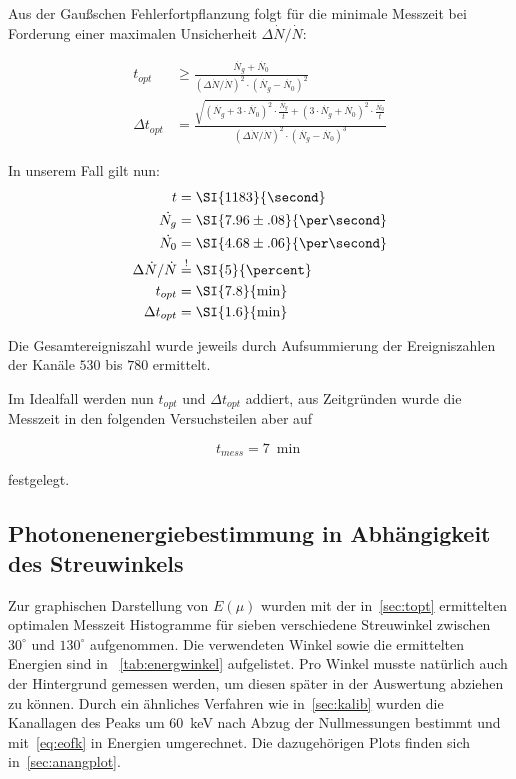 \documentclass[draft, slug=CS, room=Andreas-Schubert-Bau\,\ Labor\ 406,
supervisor=Juliane\ Volkmer, coursedate=29.\ 11.\ 2019]{../../Lab_Report_LaTeX/lab_report}
\newcommand{\kev}[1]{\SI{#1}{\kilo\electronvolt}}
\begin{document}
Aus der Gau\ss{}schen Fehlerfortpflanzung folgt f\"ur die minimale
Messzeit bei Forderung einer maximalen Unsicherheit
\(\Delta\dot{N}/\dot{N}\):

\begin{align}
  \label{eq:mtime}
  t_{opt} & \geq\frac{\dot{N_g} +
            \dot{N_0}}{(\Delta\dot{N}/\dot{N})^2\cdot (\dot{N_g} -
            \dot{N_0})^2} \\
  \Delta t_{opt} &=\frac{\sqrt{(\dot{N_g} +
                   3\cdot\dot{N_0})^2\cdot\frac{\dot{N_g}}{t}
                   + (3\cdot\dot{N_g} + \dot{N_0})^2\cdot\frac{\dot{N_0}}{t}}}{(\Delta\dot{N}/\dot{N})^2\cdot (\dot{N_g} -
            \dot{N_0})^3}
\end{align}

In unserem Fall gilt nun:
\begin{align}
  t &=\SI{1183}{\second} \\
  \dot{N_g} &=\SI{7.96\pm.08}{\per\second} \\
  \dot{N_0} &=\SI{4.68\pm.06}{\per\second} \\
  \Delta\dot{N}/\dot{N} &\overset{!}{=}\SI{5}{\percent} \\
  t_{opt} &=\SI{7.8}{\min} \\
  \Delta t_{opt} &=\SI{1.6}{\min}
\end{align}

Die Gesamtereigniszahl wurde jeweils durch Aufsummierung der
Ereigniszahlen der Kan\"ale \(530\) bis \(780\) ermittelt.

Im Idealfall werden nun \(t_{opt}\) und \(\Delta t_{opt}\) addiert,
aus Zeitgr\"unden wurde die Messzeit in den folgenden Versuchsteilen
aber auf

\begin{equation}
  \label{eq:fmtime}
  t_{mess} = \SI{7}{\min}
\end{equation}

festgelegt.

\subsection{Photonenenergiebestimmung in Abhängigkeit des Streuwinkels}
\label{sec:energwinkel}

Zur graphischen Darstellung von \(E(\mu)\) wurden mit der
in~\ref{sec:topt} ermittelten optimalen Messzeit Histogramme für
sieben verschiedene Streuwinkel zwischen \(30^\circ\) und
\(130^\circ\) aufgenommen. Die verwendeten Winkel sowie die
ermittelten Energien sind in ~\ref{tab:energwinkel} aufgelistet. Pro
Winkel musste natürlich auch der Hintergrund gemessen werden, um
diesen später in der Auswertung abziehen zu können. Durch ein
\"ahnliches Verfahren wie in~\ref{sec:kalib} wurden die Kanallagen des
Peaks um \kev{60} nach Abzug der Nullmessungen bestimmt und
mit~\ref{eq:eofk} in Energien umgerechnet. Die dazugeh\"origen Plots
finden sich in~\ref{sec:anangplot}.
\end{document}
